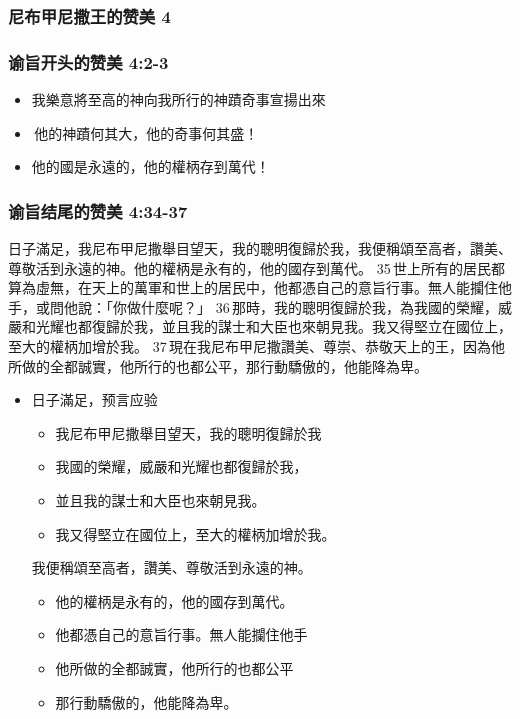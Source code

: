 \subsubsection{尼布甲尼撒王的赞美 4}
\subsubsection{谕旨开头的赞美 4:2-3}
\begin{itemize}
\itemsep-.45em  
\item 我樂意將至高的神向我所行的神蹟奇事宣揚出來
\item 他的神蹟何其大，他的奇事何其盛！
\item 他的國是永遠的，他的權柄存到萬代！
\end{itemize}

\subsubsection{谕旨结尾的赞美 4:34-37}
日子滿足，我尼布甲尼撒舉目望天，我的聰明復歸於我，我便稱頌至高者，讚美、尊敬活到永遠的神。他的權柄是永有的，他的國存到萬代。 
35 世上所有的居民都算為虛無，在天上的萬軍和世上的居民中，他都憑自己的意旨行事。無人能攔住他手，或問他說：「你做什麼呢？」 
36 那時，我的聰明復歸於我，為我國的榮耀，威嚴和光耀也都復歸於我，並且我的謀士和大臣也來朝見我。我又得堅立在國位上，至大的權柄加增於我。 
37 現在我尼布甲尼撒讚美、尊崇、恭敬天上的王，因為他所做的全都誠實，他所行的也都公平，那行動驕傲的，他能降為卑。
\begin{itemize}
\itemsep-.45em  
\item 日子滿足，预言应验
\begin{itemize}
\itemsep-.45em  
\item 我尼布甲尼撒舉目望天，我的聰明復歸於我
\item 我國的榮耀，威嚴和光耀也都復歸於我，
\item 並且我的謀士和大臣也來朝見我。
\item 我又得堅立在國位上，至大的權柄加增於我。
\end{itemize}
我便稱頌至高者，讚美、尊敬活到永遠的神。
\begin{itemize}
\itemsep-.45em  
\item 他的權柄是永有的，他的國存到萬代。 
\item 他都憑自己的意旨行事。無人能攔住他手
\item 他所做的全都誠實，他所行的也都公平
\item 那行動驕傲的，他能降為卑。
\end{itemize}
\end{itemize}

